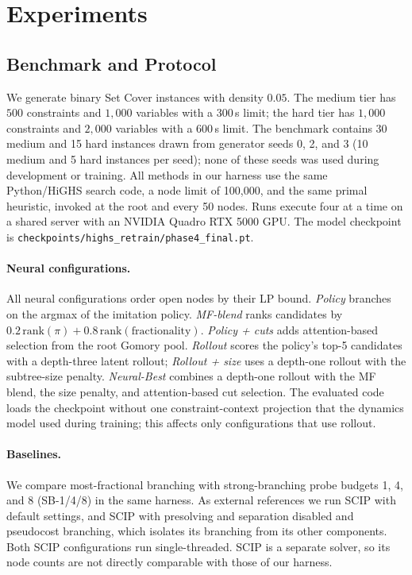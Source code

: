 \documentclass[11pt,a4paper]{article}
\begin{document}
\section{Experiments}
\label{sec:experiments}

\subsection{Benchmark and Protocol}

We generate binary Set Cover instances with density $0.05$. The medium tier has $500$ constraints and $1{,}000$ variables with a 300\,s limit; the hard tier has $1{,}000$ constraints and $2{,}000$ variables with a 600\,s limit. The benchmark contains 30 medium and 15 hard instances drawn from generator seeds 0, 2, and 3 (10 medium and 5 hard instances per seed); none of these seeds was used during development or training. All methods in our harness use the same Python/HiGHS search code, a node limit of 100{,}000, and the same primal heuristic, invoked at the root and every 50 nodes. Runs execute four at a time on a shared server with an NVIDIA Quadro RTX 5000 GPU. The model checkpoint is \texttt{checkpoints/highs\_retrain/phase4\_final.pt}.

\paragraph{Neural configurations.}
All neural configurations order open nodes by their LP bound. \emph{Policy} branches on the argmax of the imitation policy. \emph{MF-blend} ranks candidates by $0.2\,\mathrm{rank}(\pi)+0.8\,\mathrm{rank}(\text{fractionality})$. \emph{Policy + cuts} adds attention-based selection from the root Gomory pool. \emph{Rollout} scores the policy's top-5 candidates with a depth-three latent rollout; \emph{Rollout + size} uses a depth-one rollout with the subtree-size penalty. \emph{Neural-Best} combines a depth-one rollout with the MF blend, the size penalty, and attention-based cut selection. The evaluated code loads the checkpoint without one constraint-context projection that the dynamics model used during training; this affects only configurations that use rollout.

\paragraph{Baselines.}
We compare most-fractional branching with strong-branching probe budgets 1, 4, and 8 (SB-1/4/8) in the same harness. As external references we run SCIP with default settings, and SCIP with presolving and separation disabled and pseudocost branching, which isolates its branching from its other components. Both SCIP configurations run single-threaded. SCIP is a separate solver, so its node counts are not directly comparable with those of our harness.
\end{document}
